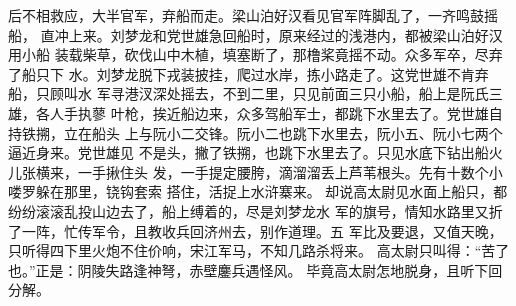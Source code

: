 后不相救应，大半官军，弃船而走。梁山泊好汉看见官军阵脚乱了，一齐鸣鼓摇船，
直冲上来。刘梦龙和党世雄急回船时，原来经过的浅港内，都被梁山泊好汉用小船
装载柴草，砍伐山中木植，填塞断了，那橹桨竟摇不动。众多军卒，尽弃了船只下
水。刘梦龙脱下戎装披挂，爬过水岸，拣小路走了。这党世雄不肯弃船，只顾叫水
军寻港汊深处摇去，不到二里，只见前面三只小船，船上是阮氏三雄，各人手执蓼
叶枪，挨近船边来，众多驾船军士，都跳下水里去了。党世雄自持铁搠，立在船头
上与阮小二交锋。阮小二也跳下水里去，阮小五、阮小七两个逼近身来。党世雄见
不是头，撇了铁搠，也跳下水里去了。只见水底下钻出船火儿张横来，一手揪住头
发，一手提定腰胯，滴溜溜丢上芦苇根头。先有十数个小喽罗躲在那里，铙钩套索
搭住，活捉上水浒寨来。
却说高太尉见水面上船只，都纷纷滚滚乱投山边去了，船上缚着的，尽是刘梦龙水
军的旗号，情知水路里又折了一阵，忙传军令，且教收兵回济州去，别作道理。五
军比及要退，又值天晚，只听得四下里火炮不住价响，宋江军马，不知几路杀将来。
高太尉只叫得：“苦了也。”正是：阴陵失路逢神弩，赤壁鏖兵遇怪风。
毕竟高太尉怎地脱身，且听下回分解。